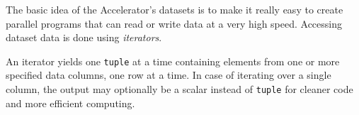 
\label{chap:iterators}

The basic idea of the Accelerator's datasets is to make it really easy
to create parallel programs that can read or write data at a very high
speed.  Accessing dataset data is done using \textsl{iterators}.

An iterator yields one \texttt{tuple} at a time containing elements
from one or more specified data columns, one row at a time.  In case
of iterating over a single column, the output may optionally be a
scalar instead of \texttt{tuple} for cleaner code and more efficient
computing.





